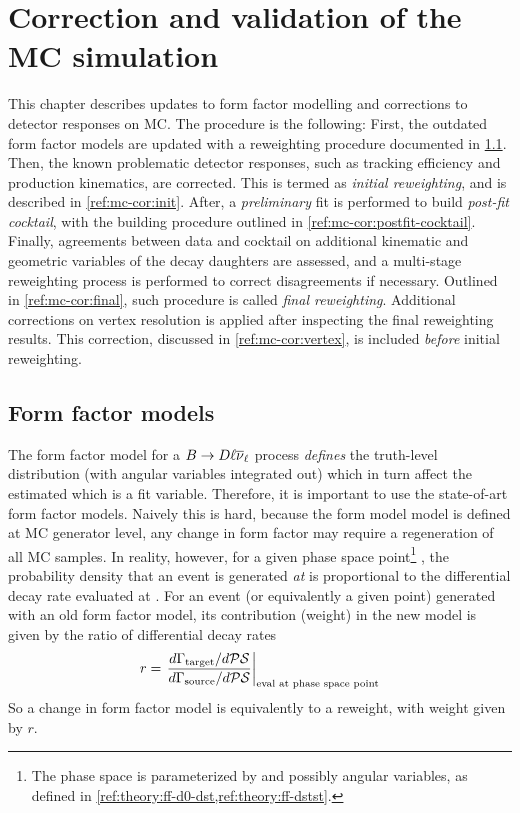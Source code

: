 \chapter{Correction and validation of the MC simulation}
\label{ref:mc-cor}

This chapter describes updates to form factor modelling and corrections to
detector responses on MC.
The procedure is the following:
First, the outdated form factor models are updated with a reweighting
procedure documented in \cref{ref:mc-cor:ff}.
Then, the known problematic detector responses,
such as tracking efficiency and \B production kinematics,
are corrected.
This is termed as \emph{initial reweighting}, and is described in
\cref{ref:mc-cor:init}.
After, a \emph{preliminary} fit is performed to build
\emph{post-fit cocktail},
with the building procedure outlined in \cref{ref:mc-cor:postfit-cocktail}.
Finally, agreements between data and cocktail on additional kinematic
and geometric variables of the \B decay daughters are assessed,
and a multi-stage reweighting process is
performed to correct disagreements if necessary.
Outlined in \cref{ref:mc-cor:final}, such procedure is called \emph{final
reweighting}.
Additional corrections on vertex resolution is applied after inspecting the
final reweighting results.
This correction, discussed in \cref{ref:mc-cor:vertex}, is included
\emph{before} initial reweighting.


\section{Form factor models}
\label{ref:mc-cor:ff}

The form factor model for a $B \rightarrow D \ell{\ensuremath{{\overline{\nu}}_\ell}}$ process \emph{defines}
the truth-level \qSq distribution (with angular variables integrated out) which
in turn affect the estimated \qSq which is a fit variable.
Therefore, it is important to use the state-of-art form factor models.
Naively this is hard, because the form model model is defined at MC generator
level, any change in form factor may require a regeneration of all MC samples.
In reality, however, for a given phase space point\footnote{
    The phase space is parameterized by \qSq and possibly angular variables,
    as defined in \cref{ref:theory:ff-d0-dst,ref:theory:ff-dstst}.
}  \PSpt, the probability density that an event is generated \emph{at}
\PSpt is proportional to the differential decay rate evaluated at
\PSpt.
For an event (or equivalently a given \PSpt point)
generated with an old form factor model,
its contribution (weight) in the new model is given by the ratio of differential
decay rates
\begin{equation}
    r = \left.
            \frac{d\Gamma_\text{target} / d\mathcal{PS}}{d\Gamma_\text{source} / d\mathcal{PS}}
        \right|_\text{eval at phase space point}
\end{equation}
So a change in form factor model is equivalently to a reweight, with weight given
by $r$.

